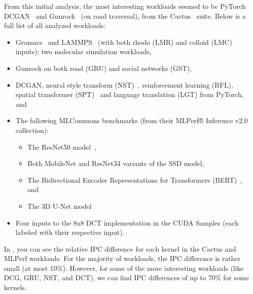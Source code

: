 From this initial analysis, the most interesting workloads seemed to be PyTorch DCGAN~\cite{dcgan} and Gunrock~\cite{gru} (on road traversal), from the Cactus~\cite{cactus} suite.
Below is a full list of all analyzed workloads:
\begin{itemize}
    \item Gromacs~\cite{gromacs} and LAMMPS~\cite{LAMMPS} (with both rhodo (LMR) and colloid (LMC) inputs); two molecular simulation workloads,
    \item Gunrock on both road (GRU) and social networks (GST),
    \item DCGAN, neural style transform (NST)~\cite{nst}, reinforcement learning (RFL), spatial transformer (SPT)~\cite{spt} and language translation (LGT) from PyTorch, and
    \item The following MLCommons benchmarks (from their MLPerf® Inference v2.0 collection):
    \begin{itemize}
        \item The ResNet50 model~\cite{resnet50},
        \item Both MobileNet and ResNet34 variants of the SSD model,
        \item The Bidirectional Encoder Representations for Transformers (BERT)~\cite{bert}, and
        \item The 3D U-Net model~\cite{3d-unet}
    \end{itemize}
    \item Four inputs to the 8x8 DCT implementation in the CUDA Samples (each labeled with their respective input).
\end{itemize}

In , you can see the relative IPC difference for each kernel in the Cactus and MLPerf workloads.
For the majority of workloads, the IPC difference is rather small (at most 10\%).
However, for some of the more interesting workloads (like DCG, GRU, NST, and DCT), we can find IPC differences of up to 70\% for some kernels.
\FloatBarrier

